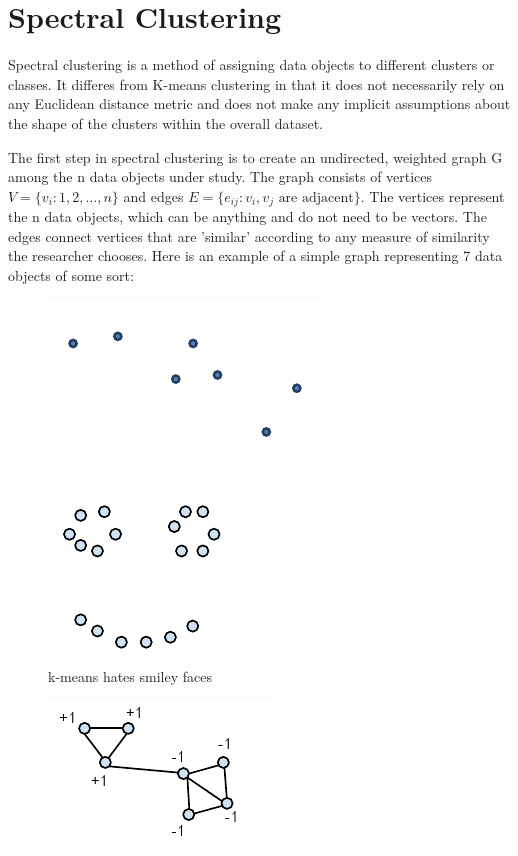 \documentclass[11pt]{article}
\begin{document}
\section{Spectral Clustering}
Spectral clustering is a method of assigning data objects to different clusters or classes.  It differes from K-means clustering in that it does not necessarily rely on any Euclidean distance metric and does not make any implicit assumptions about the shape of the clusters within the overall dataset.

The first step in spectral clustering is to create an undirected, weighted graph G among the n data objects under study.  The graph consists of vertices $V=\{v_i:1,2,\dots,n\}$ and edges $E=\{e_{ij}:v_i, v_j \text{ are adjacent}\}$.  The vertices represent the n data objects, which can be anything and do not need to be vectors.  The edges connect vertices that are 'similar' according to any measure of similarity the researcher chooses.  Here is an example of a simple graph representing 7 data objects of some sort:

\begin{figure}
\includegraphics{graph_0}
\caption{}
\end{figure}

\begin{figure}
\includegraphics{smiley_face_graph}
\caption{k-means hates smiley faces}
\end{figure}

\begin{figure}
\includegraphics{graph_1}
\caption{}
\end{figure}
\end{document}
